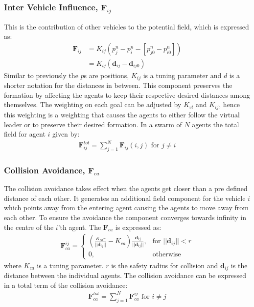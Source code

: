 \subsubsection{Inter Vehicle Influence, $\mathbf{F}_{ij}$}
This is the contribution of other vehicles to the potential field,
which is expressed as:
\begin{align}
\mathbf{F}_{ij} &= K_{ij}(p_{j}^n-p_i^n-[p_{j0}^n-p_{i0}^n])\\
&= K_{ij}(\mathbf{d}_{ij}-\mathbf{d}_{ij0})
\end{align}
Similar to previously the $p$s are positions, $K_{ij}$ is a tuning
parameter and $d$ is a shorter notation for the distances in between.
This component preserves the formation by affecting the agents to keep
their respective desired distances among themselves. The
weighting on each goal can be adjusted by $K_{vl}$ and $K_{ij}$, hence this weighting is a
weighting that causes the agents to either follow the virtual leader or to
preserve their desired formation.  In a swarm of $N$ agents the total
field for agent $i$ given by:
\begin{align}
\mathbf{F}_{ij}^{tot} = \sum\limits_{j=1}^N\mathbf{F}_{ij}(i,j) \text{ for } j\neq i
\end{align}

\subsubsection{Collision Avoidance, $\mathbf{F}_{ca}$}
The collision avoidance takes effect when the agents get closer than a
pre defined distance of each other. It generates an additional field
component for the vehicle $i$ which points away from the entering
agent causing the agents to move away from each other. To ensure the
avoidance the component converges towards infinity in the centre of
the $i$'th agent. The $\mathbf{F}_{ca}$ is expressed as:
\begin{align}
    \mathbf{F}_{ca}^{ij}= 
\begin{cases}
		\left(
    \frac{K_{ca}r}{||\mathbf{d}_{ij}||}-K_{ca}
		\right)
		\frac{\mathbf{d}_{ij}}{||\mathbf{d}_{ij}||}
		,& \text{for } ||\mathbf{d}_{ij}||<r\\
    0,              & \text{otherwise}
\end{cases}
\end{align}
where $K_{ca}$ is a tuning parameter. $r$ is the safety radius for
collision and $\mathbf{d}_{ij}$ is the distance between the individual agents.
The collision avoidance can be expressed in a total term of the
collision avoidance:
\begin{align}
\mathbf{F}_{ca}^{tot} = \sum\limits_{j=1}^N\mathbf{F}_{ca}^{ij} \text{ for } i\neq j
\end{align}

